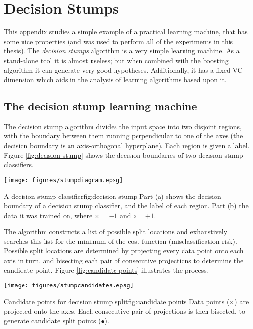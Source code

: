 
\chapter{Decision Stumps}
\label{appendix:stumps}

This appendix studies a simple example of a
practical learning machine, that has some nice properties (and was used
to perform all of the experiments in this thesis).
The \emph{decision stumps} algorithm is a very simple learning
machine.  As a stand-alone tool it is almost useless; but when
combined with the boosting algorithm it can generate very good
hypotheses.  Additionally, it has a fixed VC dimension which aids in
the analysis of learning algorithms based upon it.

\section{The decision stump learning machine}

The decision stump algorithm divides the input space into two disjoint
regions, with the boundary between them running perpendicular to one
of the axes (the decision boundary is an axis-orthogonal hyperplane).
Each region is given a label.  Figure \ref{fig:decision stump} shows
the decision boundaries of two decision stump classifiers.

\begin{linefigure}
\begin{center}
\texttt{[image: figures/stumpdiagram.epsg]}
\end{center}
\begin{capt}{A decision stump classifier}{fig:decision stump}
Part (a) shows the decision boundary of a decision stump classifier,
and the label of each region.  Part (b) the data it was trained on,
where $\times = -1$ and $\circ = +1$.
\end{capt}
\end{linefigure}

The algorithm constructs a list of possible split locations and
exhaustively searches this list for the minimum of the cost function
(misclassification risk).  Possible split locations are determined by
projecting every data point onto each axis in turn, and bisecting each
pair of consecutive projections to determine the candidate point.
Figure \ref{fig:candidate points} illustrates the process.

\begin{linefigure}
\begin{center}
\texttt{[image: figures/stumpcandidates.epsg]}
\end{center}
\begin{capt}{Candidate points for decision stump split}{fig:candidate points}
Data points ($\times$) are projected onto the axes.  Each consecutive
pair of projections is then bisected, to generate candidate split
points ($\bullet$).
\end{capt}
\end{linefigure}

